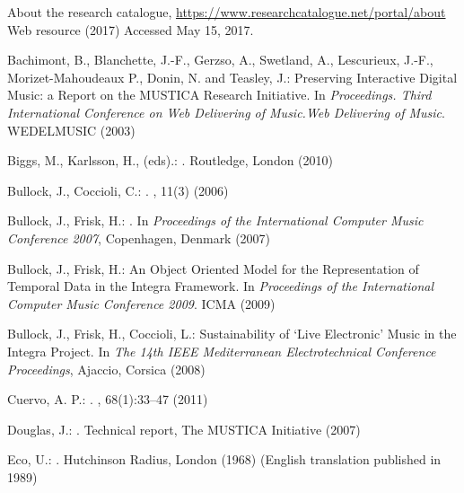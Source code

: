 \documentclass[,a4paper]{llncs}
\begin{document}
\begin{thebibliography}{10}

About the research catalogue, \url{https://www.researchcatalogue.net/portal/about}
\newblock Web resource (2017)
\newblock Accessed May 15, 2017.

Bachimont, B., Blanchette, J.-F., Gerzso, A., Swetland, A., Lescurieux, J.-F.,
  Morizet-Mahoudeaux P., Donin, N. and Teasley, J.:
\newblock Preserving Interactive Digital Music: a Report on the MUSTICA
  Research Initiative.
\newblock In {\em Proceedings. Third International Conference on Web Delivering
  of Music.Web Delivering of Music}. WEDELMUSIC (2003)

Biggs, M., Karlsson, H., (eds).:
.
\newblock Routledge, London (2010)

Bullock, J., Coccioli, C.:
.
, 11(3) (2006)

Bullock, J., Frisk, H.:
.
\newblock In {\em Proceedings of the International Computer Music Conference
  2007}, Copenhagen, Denmark (2007)

Bullock, J., Frisk, H.:
\newblock An Object Oriented Model for the Representation of Temporal Data in
  the Integra Framework.
\newblock In {\em Proceedings of the International Computer Music Conference
  2009}. ICMA (2009)

Bullock, J., Frisk, H., Coccioli, L.:
\newblock Sustainability of `Live Electronic' Music in the Integra Project.
\newblock In {\em {The 14th IEEE Mediterranean Electrotechnical Conference
  Proceedings}}, Ajaccio, Corsica (2008)

Cuervo, A. P.:
.
, 68(1):33--47 (2011)

Douglas, J.:
.
\newblock Technical report, The MUSTICA Initiative (2007)

Eco, U.:
.
\newblock Hutchinson Radius, London (1968)
\newblock (English translation published in 1989)


\end{thebibliography}
\end{document}
